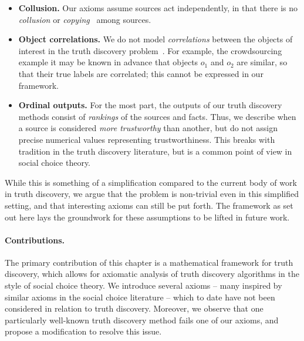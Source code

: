 \begin{itemize}

    \item \textbf{Collusion.} Our axioms assume sources act independently, in
        that there is no \emph{collusion} or
        \emph{copying}~\cite{dong_truth_2009} among sources.

    \item \textbf{Object correlations.} We do not model \emph{correlations}
          between the objects of interest in the truth discovery
          problem~\cite{yang_probabilistic_2019}. For example, the
          crowdsourcing example it may be known in advance that objects $o_1$
          and $o_2$ are similar, so that their true labels are correlated; this
          cannot be expressed in our framework.

    \item \textbf{Ordinal outputs.} For the most part, the outputs of our truth
          discovery methods consist of \emph{rankings} of the sources and
          facts. Thus, we describe when a source is considered \emph{more
          trustworthy} than another, but do not assign precise numerical values
          representing trustworthiness. This breaks with tradition in the truth
          discovery literature, but is a common point of view in social choice
          theory.
\end{itemize}

While this is something of a simplification compared to the current body of
work in truth discovery, we argue that the problem is non-trivial even in this
simplified setting, and that interesting axioms can still be put forth. The
framework as set out here lays the groundwork for these assumptions to be
lifted in future work.

\paragraph{Contributions.}

The primary contribution of this chapter is a mathematical framework for truth
discovery, which allows for axiomatic analysis of truth discovery algorithms in
the style of social choice theory. We introduce several axioms -- many inspired
by similar axioms in the social choice literature -- which to date have not
been considered in relation to truth discovery. Moreover, we observe that one
particularly well-known truth discovery method fails one of our axioms, and
propose a modification to resolve this issue.

